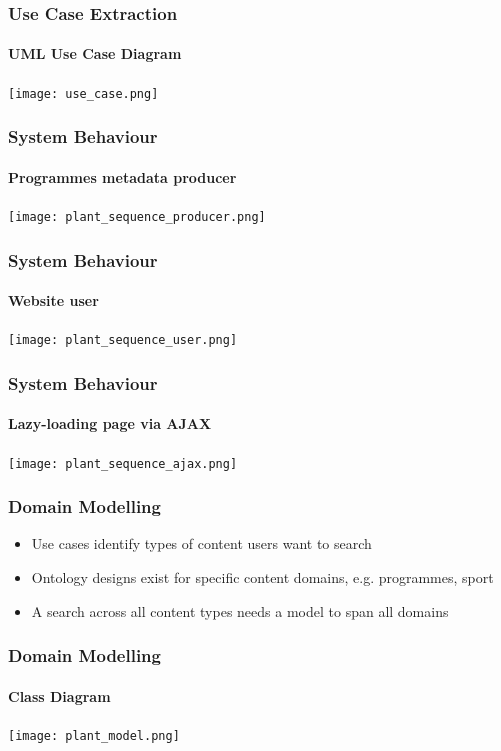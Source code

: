 \documentclass{beamer}
\begin{document}
\begin{frame}
  \frametitle{Use Case Extraction}
  \framesubtitle{UML Use Case Diagram}
  \pause \texttt{[image: use\_case.png]}
\end{frame}

\begin{frame}
  \frametitle{System Behaviour}
  \framesubtitle{Programmes metadata producer}
  \pause \texttt{[image: plant\_sequence\_producer.png]}
\end{frame}

\begin{frame}
  \frametitle{System Behaviour}
  \framesubtitle{Website user}
  \begin{center}
    \pause \texttt{[image: plant\_sequence\_user.png]}
  \end{center}
\end{frame}

\begin{frame}
  \frametitle{System Behaviour}
  \framesubtitle{Lazy-loading page via AJAX}
  \begin{center}
    \pause \texttt{[image: plant\_sequence\_ajax.png]}
  \end{center}
\end{frame}

\begin{frame}
  \frametitle{Domain Modelling}
  \begin{itemize}
    \pause \item Use cases identify types of content users want to search
    \pause \item Ontology designs exist for specific content domains, e.g. programmes, sport
    \pause \item A search across all content types needs a model to span all domains
  \end{itemize}
\end{frame}

\begin{frame}
  \frametitle{Domain Modelling}
  \framesubtitle{Class Diagram}
  \begin{center}
    \pause \texttt{[image: plant\_model.png]}
  \end{center}
\end{frame}

\end{document}
